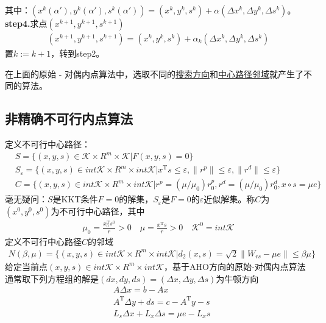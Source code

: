         其中：$(x^k({\alpha}'),y^k({\alpha}'),s^k({\alpha}'))=(x^k,y^k,s^k)+\alpha (\Delta x^k,\Delta y^k,\Delta s^k)$。\\
        \textbf{step4.}求点$(x^{k+1},y^{k+1},s^{k+1})$
        \begin{align*}
        (x^{k+1},y^{k+1},s^{k+1})=(x^k,y^k,s^k)+\alpha_k (\Delta x^k,\Delta y^k,\Delta s^k)
        \end{align*}
        置$k:=k+1$，转到step2。\par
        在上面的原始 - 对偶内点算法中，选取不同的\underline{搜索方向}和\underline{中心路径邻域}就产生了不同的算法。
    \subsection{非精确不可行内点算法}
        \par
        定义不可行中心路径：
        \begin{align*}
        &S=\{(x,y,s)\in \mathcal{K} \times  R^m \times \mathcal{K}|F(x,y,s)=0\}\\
        &S_\varepsilon=\{(x,y,s)\in int{}\mathcal{K} \times  R^m \times int{}\mathcal{K}|x^\mathrm{T} s \leqslant \varepsilon,\|r^p\| \leqslant \varepsilon,\|r^d\|\leqslant \varepsilon\}\\
        &C=\{(x,y,s)\in int{}\mathcal{K} \times  R^m \times int{}\mathcal{K}|r^p=(\mu /{\mu}_0)r_0^p,r^d= (\mu /{\mu}_0)r_0^d,x\circ s = \mu e\}
        \end{align*}
        毫无疑问：$S$是KKT条件$F = 0$的解集，$S_\varepsilon$是$F=0$的$\varepsilon$近似解集。称$C$为$(x^0, y^0,s^0)$为不可行中心路径，其中
        \begin{align*}
        {\mu}_0=\frac{x_0^\mathrm{T} s^0}{r}>0 \quad \mu=\frac{x^\mathrm{T} s}{r}>0 \quad \mathcal{K}^0=int{}\mathcal{K}
        \end{align*}
        定义不可行中心路径$C$的邻域
        \begin{align*}
        N(\beta,\mu)=\{(x,y,s)\in int{}\mathcal{K}\times R^m \times int \mathcal{K}|d_2(x,s)= \sqrt{2}\|W_{rs}-\mu e\| \leqslant \beta \mu \}
        \end{align*}
        给定当前点$(x,y,s)\in int{}\mathcal{K}\times R^m \times int{}\mathcal{K}$，基于AHO方向的原始-对偶内点算法通常取下列方程组的解是$(dx,dy,ds)=(\Delta x,\Delta y,\Delta s)$为牛顿方向
        \begin{align*}
        & A \Delta x=b-Ax\\
        & A^\mathrm{T} \Delta y+ds=c-A^\mathrm{T} y-s\\
        & L_s\Delta x+L_x\Delta s=\mu e-L_xs
        \end{align*}
